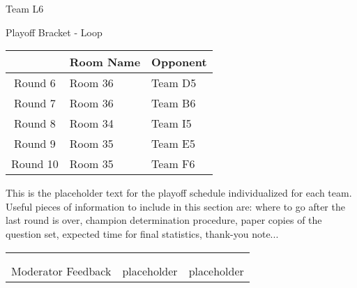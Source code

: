 \documentclass{article}%
\begin{document}
\newpage%
\begin{center}%
\begin{Huge}%
Team L6%
\end{Huge}%
\vspace*{12pt}%
\linebreak%
\begin{Large}%
Playoff Bracket {-} Loop%
\end{Large}%
\end{center}%
\vspace*{4pt}%
%
\begin{tabularx}{\textwidth}{|c|Y|Y|}%
\hline%
&Room Name&Opponent\\%
\hline%
Round 6&Room 36&Team D5\\%
Round 7&Room 36&Team B6\\%
Round 8&Room 34&Team I5\\%
Round 9&Room 35&Team E5\\%
Round 10&Room 35&Team F6\\%
\hline%
\end{tabularx}%
\vspace*{30pt}%
\linebreak%
This is the placeholder text for the playoff schedule individualized for each team. Useful pieces of information to include in this section are: where to go after the last round is over, champion determination procedure, paper copies of the question set, expected time for final statistics, thank{-}you note...%
\vspace*{30pt}%
\newline%
%
\begin{tabularx}{\textwidth}{YYY}%
  &  &  \\%
\\%
Moderator Feedback&placeholder&placeholder\\%
\end{tabularx}%
\newpage%
\end{document}
